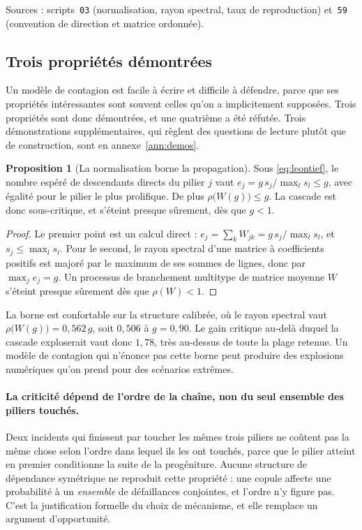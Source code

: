\documentclass[12pt,a4paper]{article}
\theoremstyle{definition}
\newtheorem{proposition}{Proposition}
\begin{document}
\vspace{4pt}
\noindent Sources : scripts~\texttt{03} (normalisation, rayon spectral, taux de
reproduction) et~\texttt{59} (convention de direction et matrice ordonnée).

\subsection{Trois propriétés démontrées}
\label{ss:proprietes}

Un modèle de contagion est facile à écrire et difficile à défendre, parce que ses
propriétés intéressantes sont souvent celles qu'on a implicitement supposées.
Trois propriétés sont donc démontrées, et une quatrième a été réfutée. Trois
démonstrations supplémentaires, qui règlent des questions de lecture plutôt que de
construction, sont en annexe~\ref{ann:demos}.

\begin{proposition}[La normalisation borne la propagation]
\label{prop:leontief}
Sous \eqref{eq:leontief}, le nombre espéré de descendants directs du pilier $j$
vaut $e_j = g\,s_j/\max_l s_l \le g$, avec égalité pour le pilier le plus
prolifique. De plus $\rho\bigl(W(g)\bigr) \le g$. La cascade est donc
sous-critique, et s'éteint presque sûrement, dès que $g < 1$.
\end{proposition}

\begin{proof}
Le premier point est un calcul direct :
$e_j = \sum_k W_{jk} = g\,s_j/\max_l s_l$, et $s_j \le \max_l s_l$. Pour le
second, le rayon spectral d'une matrice à coefficients positifs est majoré par le
maximum de ses sommes de lignes, donc par $\max_j e_j = g$. Un processus de
branchement multitype de matrice moyenne $W$ s'éteint presque sûrement dès que
$\rho(W) < 1$.
\end{proof}

La borne est confortable sur la structure calibrée, où le rayon spectral vaut
$\rho\bigl(W(g)\bigr) = 0{,}562\,g$, soit $0{,}506$ à $g = 0{,}90$. Le gain
critique au-delà duquel la cascade exploserait vaut donc $1{,}78$, très au-dessus
de toute la plage retenue. Un modèle de contagion qui n'énonce pas cette borne
peut produire des explosions numériques qu'on prend pour des scénarios extrêmes.

\paragraph{La criticité dépend de l'ordre de la chaîne, non du seul ensemble des
piliers touchés.} Deux incidents qui finissent par toucher les mêmes trois piliers
ne coûtent pas la même chose selon l'ordre dans lequel ils les ont touchés, parce
que le pilier atteint en premier conditionne la suite de la progéniture. Aucune
structure de dépendance symétrique ne reproduit cette propriété : une copule
affecte une probabilité à un \emph{ensemble} de défaillances conjointes, et
l'ordre n'y figure pas. C'est la justification formelle du choix de mécanisme, et
elle remplace un argument d'opportunité.
\end{document}

